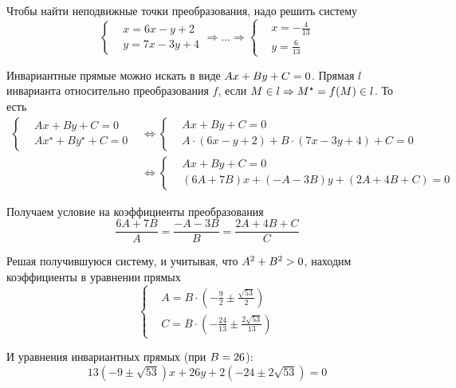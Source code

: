 \documentclass[a4paper,12pt]{article}
\begin{document}
\begin{solution}
    Чтобы найти неподвижные точки преобразования, надо решить систему
    \[
      \left\{
        \begin{aligned}
          &x = 6x - y + 2\\
          &y = 7x - 3y + 4
        \end{aligned}
      \right.
      \Rightarrow \ldots
      \Rightarrow \left\{
        \begin{aligned}
          &x = -\frac{4}{13}\\
          &y = \frac{6}{13}
        \end{aligned}
      \right.
    \]
    
    Инвариантные прямые можно искать в виде $Ax + By + C \hm= 0$.
    Прямая $l$ инварианта относительно преобразования $f$, если $M \hm\in l \hm\Rightarrow M^\star \hm= f(M) \hm\in l$.
    То есть
    \begin{equation*}
    \begin{split}
      \left\{
        \begin{aligned}
          &Ax + By + C = 0\\
          &Ax^\star + By^\star + C = 0
        \end{aligned}
      \right.
      &\Leftrightarrow \left\{
        \begin{aligned}
          &Ax + By + C = 0\\
          &A \cdot (6x - y + 2) + B \cdot (7x - 3y + 4) + C = 0
        \end{aligned}
      \right.\\
      &\Leftrightarrow \left\{
        \begin{aligned}
          &Ax + By + C = 0\\
          &(6A + 7B) x + (-A - 3B) y + (2A + 4B + C) = 0
        \end{aligned}
      \right.
    \end{split}
    \end{equation*}
    
    Получаем условие на коэффициенты преобразования
    \[
      \frac{6A + 7B}{A} = \frac{-A - 3B}{B} = \frac{2A + 4B + C}{C}
    \]
    
    Решая получившуюся систему, и учитывая, что $A^2 \hm+ B^2 \hm> 0$, находим коэффициенты в уравнении прямых
    \[
      \left\{
        \begin{aligned}
          &A = B \cdot \left(-\frac{9}{2} \pm \frac{\sqrt{53}}{2}\right)\\
          &C = B \cdot \left(-\frac{24}{13} \pm \frac{2\sqrt{53}}{13}\right)
        \end{aligned}
      \right.
    \]
    
    И уравнения инвариантных прямых (при $B \hm= 26$):
    \[
      13\left(-9 \pm \sqrt{53}\right)x + 26y + 2\left(-24 \pm 2\sqrt{53}\right) = 0
    \]
  \end{solution}
  
\end{document}
